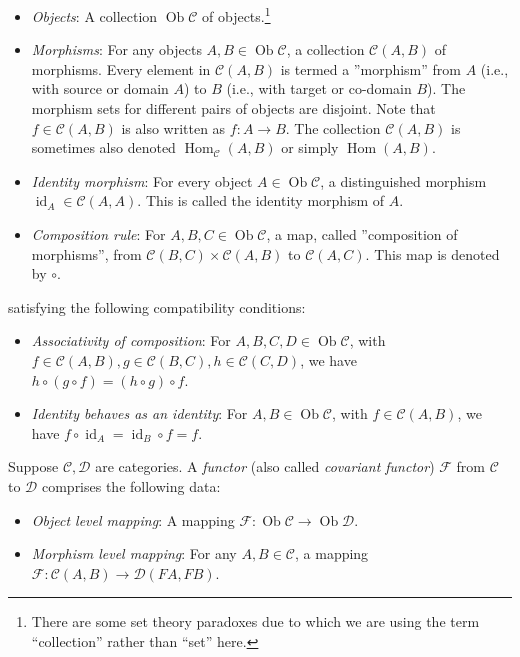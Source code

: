 \documentclass{ucetd}
\begin{document}
\begin{itemize}
\item {\em Objects}: A collection $\operatorname{Ob}\mathcal{C}$ of
  objects.\footnote{There are some set theory paradoxes due to which
    we are using the term ``collection'' rather than ``set'' here.}
\item {\em Morphisms}: For any objects $A,B \in
  \operatorname{Ob}\mathcal{C}$, a collection $\mathcal{C}(A,B)$ of
  morphisms. Every element in $\mathcal{C}(A,B)$ is termed a
  ''morphism'' from $A$ (i.e., with source or domain $A$) to $B$
  (i.e., with target or co-domain $B$). The morphism sets for
  different pairs of objects are disjoint. Note that $f \in
  \mathcal{C}(A,B)$ is also written as $f:A \to B$. The collection
  $\mathcal{C}(A,B)$ is sometimes also denoted
  $\operatorname{Hom}_{\mathcal{C}}(A,B)$ or simply
  $\operatorname{Hom}(A,B)$.
\item {\em Identity morphism}: For every object $A \in
  \operatorname{Ob}\mathcal{C}$, a distinguished morphism
  $\operatorname{id}_A \in \mathcal{C}(A,A)$. This is called the
  identity morphism of $A$.
\item {\em Composition rule}: For $A,B,C \in
  \operatorname{Ob}\mathcal{C}$, a map, called ''composition of
  morphisms'', from $\mathcal{C}(B,C) \times \mathcal{C}(A,B)$ to
  $\mathcal{C}(A,C)$. This map is denoted by $\circ$.
\end{itemize}

satisfying the following compatibility conditions:

\begin{itemize}
\item {\em Associativity of composition}: For $A,B,C,D \in
  \operatorname{Ob}\mathcal{C}$, with $f \in \mathcal{C}(A,B), g \in
  \mathcal{C}(B,C), h \in \mathcal{C}(C,D)$, we have $h \circ (g \circ
  f) = (h \circ g) \circ f$.
\item {\em Identity behaves as an identity}: For $A,B \in
  \operatorname{Ob}\mathcal{C}$, with $f \in \mathcal{C}(A,B)$, we
  have $f \circ \operatorname{id}_A = \operatorname{id}_B \circ f =
  f$.
\end{itemize}

Suppose $\mathcal{C},\mathcal{D}$ are categories. A {\em functor}
(also called {\em covariant functor}) $\mathcal{F}$ from $\mathcal{C}$
to $\mathcal{D}$ comprises the following data:

\begin{itemize}
\item {\em Object level mapping}: A mapping $\mathcal{F}:
  \operatorname{Ob}\mathcal{C} \to \operatorname{Ob}\mathcal{D}$.
\item {\em Morphism level mapping}: For any $A,B \in \mathcal{C}$, a
  mapping $\mathcal{F}: \mathcal{C}(A,B) \to \mathcal{D}(FA,FB)$.
\end{itemize}
\end{document}
